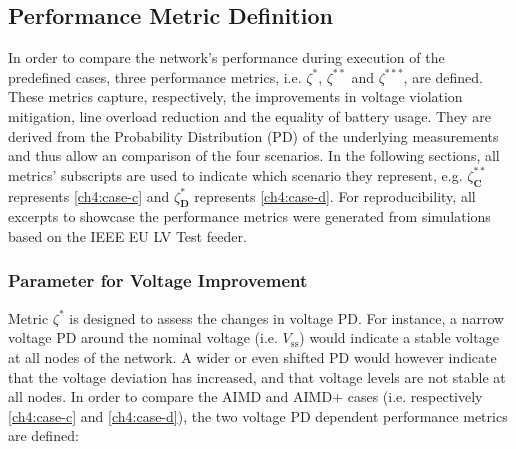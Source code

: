 \subsection{Performance Metric Definition}
\label{ch4:subsec:performance-metric-definition}

In order to compare the network's performance during execution of the predefined cases, three performance metrics, i.e. $\zeta^{*}$, $\zeta^{**}$ and $\zeta^{***}$, are defined.
These metrics capture, respectively, the improvements in voltage violation mitigation, line overload reduction and the equality of battery usage.
They are derived from the Probability Distribution (PD) of the underlying measurements and thus allow an comparison of the four scenarios.
In the following sections, all metrics' subscripts are used to indicate which scenario they represent, e.g. $\zeta_\textbf{C}^{**}$ represents \ref{ch4:case-c} and $\zeta_\textbf{D}^{*}$ represents \ref{ch4:case-d}.
For reproducibility, all excerpts to showcase the performance metrics were generated from simulations based on the IEEE EU LV Test feeder.

\subsubsection{Parameter for Voltage Improvement}

Metric $\zeta^{*}$ is designed to assess the changes in voltage PD.
For instance, a narrow voltage PD around the nominal voltage (i.e. $V_\text{ss}$) would indicate a stable voltage at all nodes of the network.
A wider or even shifted PD would however indicate that the voltage deviation has increased, and that voltage levels are not stable at all nodes.
In order to compare the AIMD and AIMD+ cases (i.e. respectively \ref{ch4:case-c} and \ref{ch4:case-d}), the two voltage PD dependent performance metrics are defined:






